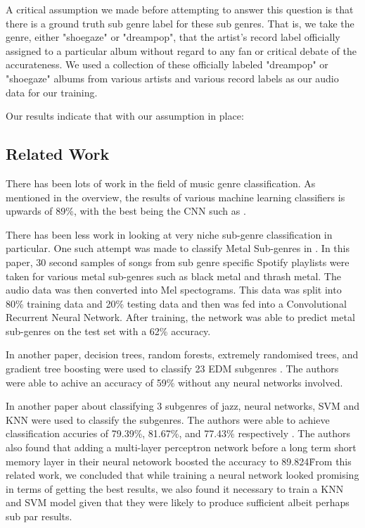 \documentclass[letterpaper, 12 pt, conference]{ieeeconf}  %
\begin{document}
A critical assumption we made before attempting to answer this question is that there is a ground truth sub genre label for these sub genres. That is, we take the genre, either "shoegaze" or "dreampop", that the artist's record label officially assigned to a particular album without regard to any fan or critical debate of the accurateness. We used a collection of these officially labeled "dreampop" or "shoegaze" albums from various artists and various record labels as our audio data for our training.

Our results indicate that with our assumption in place: 




\subsection{Related Work}


There has been lots of work in the field of music genre classification. As mentioned in the overview, the results of various machine learning classifiers is upwards of 89\%, with the best being the CNN such as \cite{c4}. 

There has been less work in looking at very niche sub-genre classification in particular. One such attempt was made to classify Metal Sub-genres in \cite{c5}. In this paper, 30 second samples of songs from sub genre specific Spotify playlists were taken for various metal sub-genres such as black metal and thrash metal. The audio data was then converted into Mel spectograms. This data was split into 80\% training data and 20\% testing data and then was fed into a Convolutional Recurrent Neural Network. After training, the network was able to predict metal sub-genres on the test set with a 62\% accuracy. 

In another paper, decision trees, random forests, extremely randomised trees, and gradient tree boosting were used to classify 23 EDM subgenres \cite{c6}. The authors were able to achive an accuracy of 59\% without any neural networks involved.

In another paper about classifying 3 subgenres of jazz, neural networks, SVM and KNN were used to classify the subgenres. The authors were able to achieve classification accuries of 79.39\%, 81.67\%, and 77.43\%  respectively \cite{c7}. The authors also found that adding a multi-layer perceptron network before a long term short memory layer in their neural netowork boosted the accuracy to 89.824\.%

From this related work, we concluded that while training a neural network looked promising in terms of getting the best results, we also found it necessary to train a KNN and SVM model given that they were likely to produce sufficient albeit perhaps sub par results. 
\end{document}
